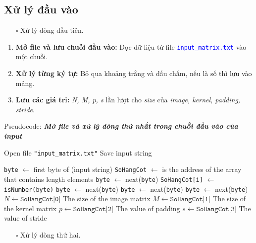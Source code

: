 \documentclass{article}
\begin{document}
\subsection{Xử lý đầu vào}
\begin{itemize}
	\item [$\square$] Xử lý dòng đầu tiên.
\end{itemize}
\begin{enumerate}
	\item \textbf{Mở file và lưu chuỗi đầu vào:} Đọc dữ liệu từ file \texttt{\textcolor{blue}{input\_matrix.txt}} vào một chuỗi.
	\item \textbf{Xử lý từng ký tự:} Bỏ qua khoảng trắng và dấu chấm, nếu là số thì lưu vào mảng.
	\item \textbf{Lưu các giá tri:} \textit{N, M, p, s} lần lượt cho \textit{size} của \textit{image, kernel, padding, stride}.
\end{enumerate}
\begin{algorithm}
	\caption{Pseudocode: \textit{\textbf{Mở file và xử lý dòng thứ nhất trong chuỗi đầu vào của input}}}
	\begin{algorithmic}[1]
		\State Open file \texttt{"input\_matrix.txt"}
		\State Save input string
		
		\State \texttt{byte} $\gets$ first byte of (input string)
		\State \texttt{SoHangCot} $\gets$ is the address of the array that contains length elements
		\State \texttt{byte} $\gets$ next(\texttt{byte}) 
		\EndIf
		\State \texttt{SoHangCot[i]} $\gets$ \texttt{isNumber(byte)}
		\State \texttt{byte} $\gets$ next(\texttt{byte})
		\EndIf
		 
		\State \texttt{byte} $\gets$ next(\texttt{byte})
		\State \texttt{byte} $\gets$ next(\texttt{byte})
		\EndIf
		\EndFor
		\State $N \gets \texttt{SoHangCot[0]}$ The size of the image matrix
		\State $M \gets \texttt{SoHangCot[1]}$ The size of the kernel matrix
		\State $p \gets \texttt{SoHangCot[2]}$ The value of padding
		\State $s \gets \texttt{SoHangCot[3]}$ The value of stride
	\end{algorithmic}
\end{algorithm}
\pagebreak
\begin{itemize}
	\item [$\square$] Xử lý dòng thứ hai.
\end{itemize}
\end{document}
